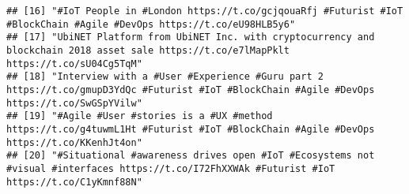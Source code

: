 \documentclass[]{article}
\newenvironment{Shaded}{\begin{snugshade}}{\end{snugshade}}
\newcommand{\OperatorTok}[1]{\textcolor[rgb]{0.81,0.36,0.00}{\textbf{#1}}}
\newcommand{\NormalTok}[1]{#1}
\begin{document}
\begin{verbatim}
## [16] "#IoT People in #London https://t.co/gcjqouaRfj #Futurist #IoT #BlockChain #Agile #DevOps https://t.co/eU98HLB5y6"                            
## [17] "UbiNET Platform from UbiNET Inc. with cryptocurrency and blockchain 2018 asset sale https://t.co/e7lMapPklt https://t.co/sU04Cg5TqM"        
## [18] "Interview with a #User #Experience #Guru part 2 https://t.co/gmupD3YdQc #Futurist #IoT #BlockChain #Agile #DevOps https://t.co/SwGSpYVilw"   
## [19] "#Agile #User #stories is a #UX #method https://t.co/g4tuwmL1Ht #Futurist #IoT #BlockChain #Agile #DevOps https://t.co/KKenhJt4on"            
## [20] "#Situational #awareness drives open #IoT #Ecosystems not #visual #interfaces https://t.co/I72FhXXWAk #Futurist #IoT https://t.co/C1yKmnf88N"
\end{verbatim}

\begin{Shaded}
\end{Shaded}
\end{document}
